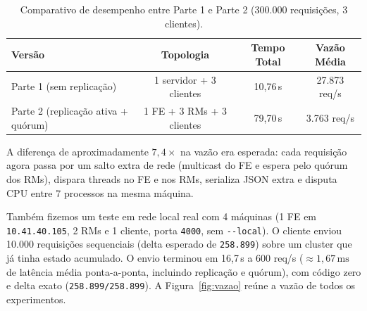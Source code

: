 \documentclass[12pt]{article}
\begin{document}
\begin{table}[H]
\centering
\caption{Comparativo de desempenho entre Parte 1 e Parte 2 (300.000 requisições, 3 clientes).}
\label{tab:comparativo}
\footnotesize
\begin{tabular}{l c c c}
\toprule
\textbf{Versão} & \textbf{Topologia} & \textbf{Tempo Total} & \textbf{Vazão Média} \\
\midrule
Parte 1 (sem replicação) & 1 servidor + 3 clientes & 10,76\,s & 27.873 req/s \\
Parte 2 (replicação ativa + quórum) & 1 FE + 3 RMs + 3 clientes & 79,70\,s & 3.763 req/s \\
\bottomrule
\end{tabular}
\end{table}

A diferença de aproximadamente $7{,}4\times$ na vazão era esperada: cada requisição agora passa por um salto extra de rede (multicast do FE e espera pelo quórum dos RMs), dispara threads no FE e nos RMs, serializa JSON extra e disputa CPU entre 7 processos na mesma máquina.

Também fizemos um teste em rede local real com 4 máquinas (1 FE em \texttt{10.41.40.105}, 2 RMs e 1 cliente, porta \texttt{4000}, sem \texttt{-{-}local}). O cliente enviou 10.000 requisições sequenciais (delta esperado de \texttt{258.899}) sobre um cluster que já tinha estado acumulado. O envio terminou em 16,7\,s a 600 req/s ($\approx 1{,}67\,\text{ms}$ de latência média ponta-a-ponta, incluindo replicação e quórum), com código zero e delta exato (\texttt{258.899/258.899}). A Figura~\ref{fig:vazao} reúne a vazão de todos os experimentos.
\end{document}
